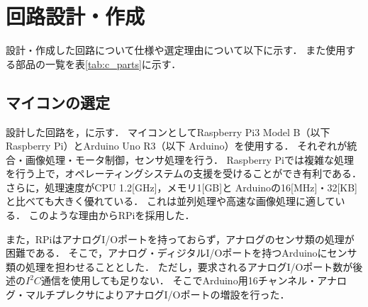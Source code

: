 \documentclass[11pt,a4]{jsarticle}
\begin{document}

\section{回路設計・作成} %
  設計・作成した回路について仕様や選定理由について以下に示す．
  また使用する部品の一覧を表\ref{tab:c_parts}に示す．

  \subsection{マイコンの選定}
    設計した回路を，に示す．
    マイコンとしてRaspberry Pi3 Model B（以下 Raspberry Pi）とArduino Uno R3（以下 Arduino）を使用する．
    それぞれが統合・画像処理・モータ制御，センサ処理を行う．
    Raspberry Piでは複雑な処理を行う上で，オペレーティングシステムの支援を受けることができ有利である．
    さらに，処理速度がCPU 1.2[GHz]，メモリ1[GB]と
    Arduinoの16[MHz]・32[KB]と比べても大きく優れている．
    これは並列処理や高速な画像処理に適している．
    このような理由からRPiを採用した．

    また，RPiはアナログI/Oポートを持っておらず，アナログのセンサ類の処理が困難である．
    そこで，アナログ・ディジタルI/Oポートを持つArduinoにセンサ類の処理を担わせることとした．
    ただし，要求されるアナログI/Oポート数が後述の$I^2 C$通信を使用しても足りない．
    そこでArduino用16チャンネル・アナログ・マルチプレクサによりアナログI/Oポートの増設を行った．
\end{document}
